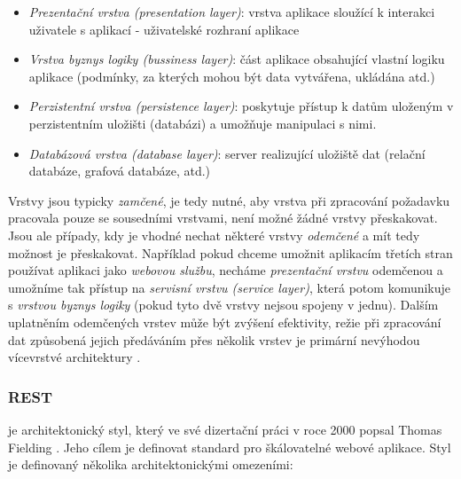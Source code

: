 \begin{itemize}
  \item{\textit{Prezentační vrstva (presentation layer)}}: vrstva aplikace sloužící k interakci uživatele s aplikací - uživatelské rozhraní aplikace 
  \item{\textit{Vrstva byznys logiky (bussiness layer)}}: část aplikace obsahující vlastní logiku aplikace (podmínky, za kterých mohou být data vytvářena, ukládána atd.)
  \item{\textit{Perzistentní vrstva (persistence layer)}}: poskytuje přístup k datům uloženým v perzistentním uložišti (databázi) a umožňuje manipulaci s nimi. 
  \item{\textit{Databázová vrstva (database layer)}}: server realizující uložiště dat (relační databáze, grafová databáze, atd.) 
\end{itemize}

Vrstvy jsou typicky \textit{zamčené}, je tedy nutné, aby vrstva při zpracování požadavku pracovala pouze se sousedními vrstvami, není možné žádné vrstvy přeskakovat. Jsou ale případy, kdy je vhodné nechat některé vrstvy \textit{odemčené} a mít tedy možnost je přeskakovat. Například pokud chceme umožnit aplikacím třetích stran používat aplikaci jako \textit{webovou službu}, necháme \textit{prezentační vrstvu} odemčenou a umožníme tak přístup na \textit{servisní vrstvu (service layer)}, která potom komunikuje s \textit{vrstvou byznys logiky} (pokud tyto dvě vrstvy nejsou spojeny v jednu). Dalším uplatněním odemčených vrstev může být zvýšení efektivity, režie při zpracování dat způsobená  jejich předáváním přes několik vrstev je primární nevýhodou vícevrstvé architektury \cite{Clark90}. 





\subsubsection{REST}
\label{sec:rest}
\textit{} je architektonický styl, který ve své dizertační práci v roce 2000 popsal Thomas Fielding \cite{Fielding00}. Jeho cílem je definovat standard pro škálovatelné webové aplikace. Styl je definovaný několika architektonickými omezeními: 

